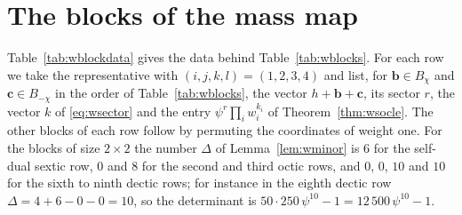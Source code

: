 \documentclass[11pt]{amsart}
\theoremstyle{definition}
\theoremstyle{remark}
\newcommand{\bb}{\mathbf{b}}
\newcommand{\cc}{\mathbf{c}}
\begin{document}
\section{The blocks of the mass map}\label{app:wblocks}

Table~\ref{tab:wblockdata} gives the data behind Table~\ref{tab:wblocks}.
For each row we take the representative with $(i,j,k,l)=(1,2,3,4)$ and
list, for $\bb\in B_\chi$ and $\cc\in B_{-\chi}$ in the order of
Table~\ref{tab:wblocks}, the vector $h+\bb+\cc$, its sector $r$, the vector
$k$ of \eqref{eq:wsector} and the entry $\psi^r\prod_iw_i^{k_i}$ of
Theorem~\ref{thm:wsocle}. The other blocks of each row follow by permuting
the coordinates of weight one. For the blocks of size $2\times2$ the number
$\Delta$ of Lemma~\ref{lem:wminor} is $6$ for the self-dual sextic row, $0$
and $8$ for the second and third octic rows, and $0$, $0$, $10$ and $10$ for
the sixth to ninth dectic rows; for instance in the eighth dectic row
$\Delta=4+6-0-0=10$, so the determinant is
$50\cdot250\,\psi^{10}-1=12\,500\,\psi^{10}-1$.
\end{document}
